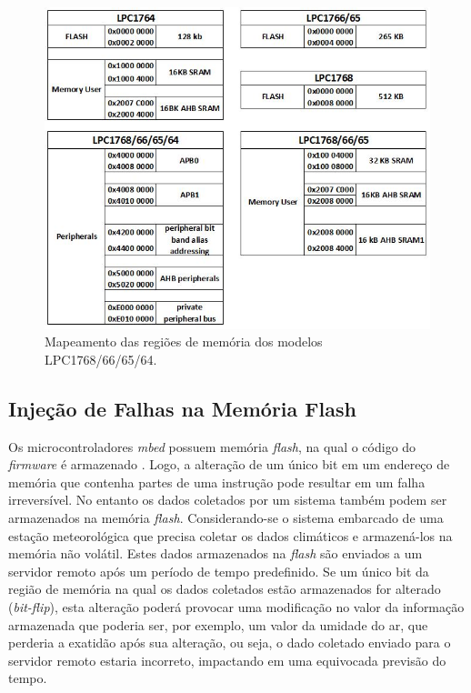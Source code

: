\begin{figure}[H]
	\centering
	\includegraphics[width=1.0\textwidth]{figuras/memoryMap.jpg}
	\caption[Mapas das Regiões de Memória dos Modelos LPC1768/66/65/64]{Mapeamento das regiões de memória dos modelos LPC1768/66/65/64.}
	\label{Img:memoryMap}	
\end{figure}


\subsection{Injeção de Falhas na Memória Flash} \label{subsec:InjecaoFalhasFlash}

Os microcontroladores \textit{mbed} possuem memória \textit{flash}, na qual o código do \textit{firmware} é armazenado \cite{manualLpc176x:2016}. Logo, a alteração de um único bit em um endereço de memória que contenha partes de uma instrução pode resultar em um falha irreversível. No entanto os dados coletados por um sistema também podem ser armazenados na memória \textit{flash}. Considerando-se o sistema embarcado de uma estação meteorológica que precisa coletar os dados climáticos e armazená-los na memória não volátil. Estes dados armazenados na \textit{flash} são enviados a um servidor remoto após um período de tempo predefinido. Se um único bit da região de memória na qual os dados coletados estão armazenados for alterado (\textit{bit-flip}), esta alteração poderá provocar uma modificação no valor da informação armazenada que poderia ser, por exemplo, um valor da umidade do ar, que perderia a exatidão após sua alteração, ou seja, o dado coletado enviado para o servidor remoto estaria incorreto, impactando em uma equivocada previsão do tempo. 

